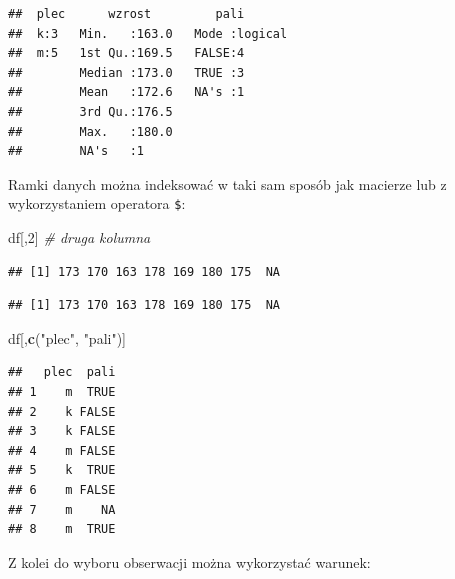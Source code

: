 \documentclass[]{book}
\newenvironment{Shaded}{\begin{snugshade}}{\end{snugshade}}
\newcommand{\KeywordTok}[1]{\textcolor[rgb]{0.13,0.29,0.53}{\textbf{#1}}}
\newcommand{\DecValTok}[1]{\textcolor[rgb]{0.00,0.00,0.81}{#1}}
\newcommand{\StringTok}[1]{\textcolor[rgb]{0.31,0.60,0.02}{#1}}
\newcommand{\CommentTok}[1]{\textcolor[rgb]{0.56,0.35,0.01}{\textit{#1}}}
\newcommand{\OperatorTok}[1]{\textcolor[rgb]{0.81,0.36,0.00}{\textbf{#1}}}
\newcommand{\NormalTok}[1]{#1}
\begin{document}
\begin{verbatim}
##  plec      wzrost         pali        
##  k:3   Min.   :163.0   Mode :logical  
##  m:5   1st Qu.:169.5   FALSE:4        
##        Median :173.0   TRUE :3        
##        Mean   :172.6   NA's :1        
##        3rd Qu.:176.5                  
##        Max.   :180.0                  
##        NA's   :1
\end{verbatim}

Ramki danych można indeksować w taki sam sposób jak macierze lub z
wykorzystaniem operatora \texttt{\$}:

\begin{Shaded}
\begin{Highlighting}[]
\NormalTok{df[,}\DecValTok{2}\NormalTok{] }\CommentTok{# druga kolumna}
\end{Highlighting}
\end{Shaded}

\begin{verbatim}
## [1] 173 170 163 178 169 180 175  NA
\end{verbatim}

\begin{Shaded}
\end{Shaded}

\begin{verbatim}
## [1] 173 170 163 178 169 180 175  NA
\end{verbatim}

\begin{Shaded}
\begin{Highlighting}[]
\NormalTok{df[,}\KeywordTok{c}\NormalTok{(}\StringTok{"plec"}\NormalTok{, }\StringTok{"pali"}\NormalTok{)]}
\end{Highlighting}
\end{Shaded}

\begin{verbatim}
##   plec  pali
## 1    m  TRUE
## 2    k FALSE
## 3    k FALSE
## 4    m FALSE
## 5    k  TRUE
## 6    m FALSE
## 7    m    NA
## 8    m  TRUE
\end{verbatim}

Z kolei do wyboru obserwacji można wykorzystać warunek:

\begin{Shaded}
\end{Shaded}
\end{document}
